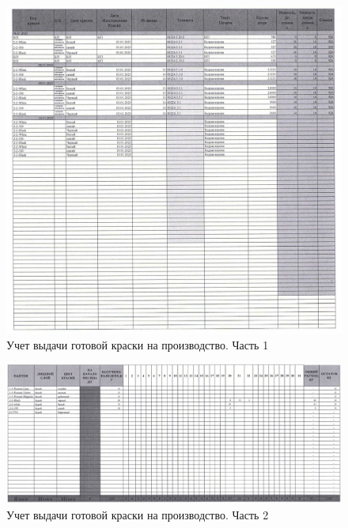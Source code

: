 \begin{figure}
\begin{center}
 \includegraphics[width=\linewidth, height=0.94\textheight, angle=90, keepaspectratio]{Pics/f19.jpg}
\end{center}
\caption{Учет выдачи готовой краски на производство. Часть 1}
\label{pic:f19}
\end{figure}

\begin{figure}
\begin{center}
 \includegraphics[width=\linewidth, height=0.94\textheight, angle=90, keepaspectratio]{Pics/f20.jpg}
\end{center}
\caption{Учет выдачи готовой краски на производство. Часть 2}
\label{pic:f20}
\end{figure}

